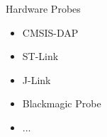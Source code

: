 \documentclass[aspectratio=1610,14pt,t]{beamer}
\begin{document}
\begin{frame}[c]{Hardware Probes}
  \begin{itemize}
    \item CMSIS-DAP
    \item ST-Link
    \item J-Link
    \item Blackmagic Probe
    \item ...
  \end{itemize}
\end{frame}
\end{document}
